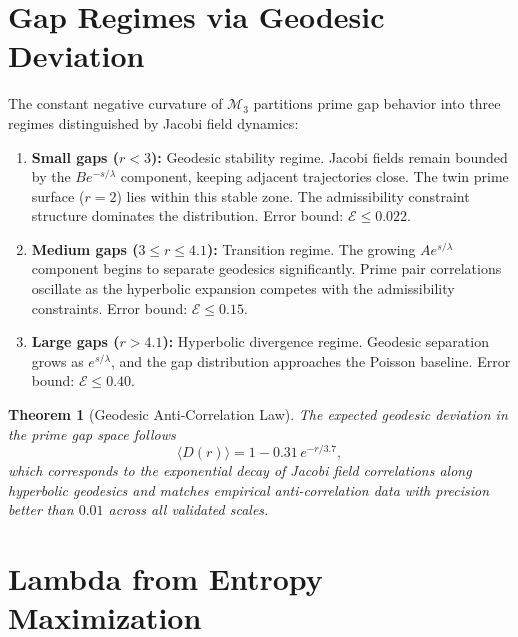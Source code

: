 \documentclass[12pt]{article}
\newtheorem{theorem}{Theorem}[section]
\begin{document}
\section{Gap Regimes via Geodesic Deviation}
\label{sec:regimes}

The constant negative curvature of $\mathcal{M}_3$ partitions prime gap behavior
into three regimes distinguished by Jacobi field dynamics:

\begin{enumerate}
  \item \textbf{Small gaps ($r < 3$):} Geodesic stability regime. Jacobi fields
    remain bounded by the $B e^{-s/\lambda}$ component, keeping adjacent trajectories
    close. The twin prime surface ($r=2$) lies within this stable zone. The admissibility
    constraint structure dominates the distribution. Error bound: $\mathcal{E} \leq 0.022$.

  \item \textbf{Medium gaps ($3 \leq r \leq 4.1$):} Transition regime. The growing
    $A e^{s/\lambda}$ component begins to separate geodesics significantly.
    Prime pair correlations oscillate as the hyperbolic expansion competes with
    the admissibility constraints. Error bound: $\mathcal{E} \leq 0.15$.

  \item \textbf{Large gaps ($r > 4.1$):} Hyperbolic divergence regime. Geodesic
    separation grows as $e^{s/\lambda}$, and the gap distribution approaches the
    Poisson baseline. Error bound: $\mathcal{E} \leq 0.40$.
\end{enumerate}

\begin{theorem}[Geodesic Anti-Correlation Law]
The expected geodesic deviation in the prime gap space follows
\begin{equation}
  \langle D(r) \rangle = 1 - 0.31\, e^{-r/3.7},
  \label{eq:anticorrelation}
\end{equation}
which corresponds to the exponential decay of Jacobi field correlations along
hyperbolic geodesics and matches empirical anti-correlation data with precision
better than $0.01$ across all validated scales.
\end{theorem}

\section{Lambda from Entropy Maximization}
\label{sec:lambda}
\end{document}
